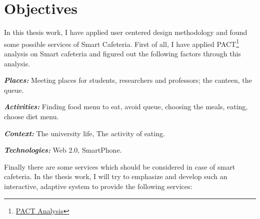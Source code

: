 \section{Objectives}
In this thesis work, I have applied user centered design methodology and found
some possible services of Smart Cafeteria. First of all, I have applied
PACT\footnote{\href{http://hci.ilikecake.ie/requirements/pact.htm}{PACT
Analysis}} analysis on Smart cafeteria and figured out the following factors
through this analysis.

\textit{\textbf{Places:}} Meeting places for students, researchers and professors; the
canteen, the queue.

\textit{\textbf{Activities:}} Finding food menu to eat, avoid queue, choosing
the meals, eating, choose diet menu.

\textit{\textbf{Context:}} The university life, The activity of eating.

\textit{\textbf{Technologies:}} Web 2.0, SmartPhone.

Finally there are some services which should be considered in case of smart
cafeteria. In the thesis work, I will try to emphasize and develop such an
interactive, adaptive system to provide the following services:

